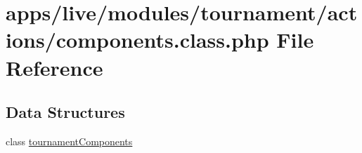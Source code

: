 \hypertarget{live_2modules_2tournament_2actions_2components_8class_8php}{\section{apps/live/modules/tournament/actions/components.class.\-php File Reference}
\label{live_2modules_2tournament_2actions_2components_8class_8php}
}
\subsection*{Data Structures}
\begin{DoxyCompactItemize}
\item 
class \hyperlink{classtournament_components}{tournament\-Components}
\end{DoxyCompactItemize}

